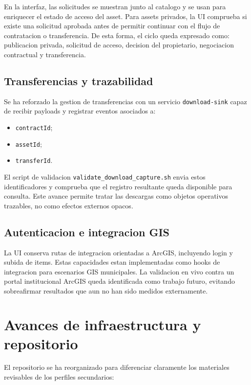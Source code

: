 \documentclass{article}
\begin{document}
En la interfaz, las solicitudes se muestran junto al catalogo y se usan para enriquecer el estado de acceso del asset. Para assets privados, la UI comprueba si existe una solicitud aprobada antes de permitir continuar con el flujo de contratacion o transferencia. De esta forma, el ciclo queda expresado como: publicacion privada, solicitud de acceso, decision del propietario, negociacion contractual y transferencia.

\subsection{Transferencias y trazabilidad}

Se ha reforzado la gestion de transferencias con un servicio \texttt{download-sink} capaz de recibir payloads y registrar eventos asociados a:

\begin{itemize}[leftmargin=1.2cm]
    \item \texttt{contractId};
    \item \texttt{assetId};
    \item \texttt{transferId}.
\end{itemize}

El script de validacion \texttt{validate\_download\_capture.sh} envia estos identificadores y comprueba que el registro resultante queda disponible para consulta. Este avance permite tratar las descargas como objetos operativos trazables, no como efectos externos opacos.

\subsection{Autenticacion e integracion GIS}

La UI conserva rutas de integracion orientadas a ArcGIS, incluyendo login y subida de items. Estas capacidades estan implementadas como hooks de integracion para escenarios GIS municipales. La validacion en vivo contra un portal institucional ArcGIS queda identificada como trabajo futuro, evitando sobreafirmar resultados que aun no han sido medidos externamente.

\section{Avances de infraestructura y repositorio}

El repositorio se ha reorganizado para diferenciar claramente los materiales revisables de los perfiles secundarios:
\end{document}
